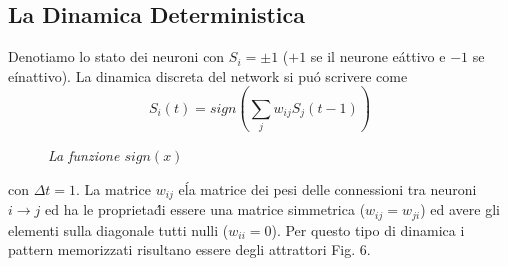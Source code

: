 \documentclass[12pt, a4paper]{book}
\theoremstyle{theorem}
\begin{document}
			\subsection{La Dinamica Deterministica}
				Denotiamo lo stato dei neuroni con $S_i=\pm 1$ ($+1$ se il neurone e\' attivo e $-1$ se e\' inattivo). La dinamica discreta del network si pu\'o scrivere come
				\begin{equation}
					S_i(t) = sign \left( \sum_j w_{ij} S_j(t-1)\right) 
				\end{equation}
				\begin{figure}
					\centering
					\caption{\textit{La funzione $sign(x)$}}
				\end{figure}
				con $\Delta t = 1$. La matrice $w_{ij}$ e\' la matrice dei pesi delle connessioni  tra neuroni $i\rightarrow j$ ed ha le proprieta\' di essere una matrice simmetrica ($w_{ij}=w_{ji}$) ed avere gli elementi sulla diagonale tutti nulli ($w_{ii}=0$).
				Per questo tipo di dinamica i pattern memorizzati risultano essere degli attrattori Fig. 6.
\end{document}
